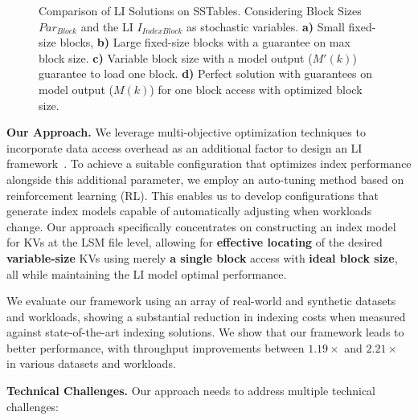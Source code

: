 \begin{figure}
  \centering
  \caption{\small{Comparison of LI Solutions on SSTables. Considering Block Sizes $Par_{Block}$ and the LI $I_{IndexBlock}$ as stochastic variables. \textbf{a)} Small fixed-size blocks, \textbf{b)} Large fixed-size blocks with a guarantee on max block size. \textbf{c)} Variable block size with a model output ($M'(k)$) guarantee to load one block. \textbf{d)} Perfect solution with guarantees on model output ($M(k)$) for one block access with optimized block size.}}
  \label{fig:prev-designs}
  \vspace{-1.7em}
\end{figure}

\vspace{3pt}
\noindent\textbf{Our Approach.} We leverage multi-objective optimization techniques to incorporate data access overhead as an additional factor to design an LI framework~\cite{boyd2004convex}. To achieve a suitable configuration that optimizes index performance alongside this additional parameter, we employ an auto-tuning method based on reinforcement learning (RL). This enables us to develop configurations that generate index models capable of automatically adjusting when workloads change. Our approach specifically concentrates on constructing an index model for KVs at the LSM file level, allowing for \textbf{effective locating} of the desired \textbf{variable-size} KVs using merely \textbf{a single block} access with \textbf{ideal block size}, all while maintaining the LI model optimal performance.

We evaluate our framework using an array of real-world and synthetic datasets and workloads, showing a substantial reduction in indexing costs when measured against state-of-the-art indexing solutions. We show that our framework leads to better performance, with throughput improvements between $1.19\times$ and $2.21\times$ in various datasets and workloads.

\noindent\textbf{Technical Challenges.} Our approach needs to address multiple technical challenges:  

